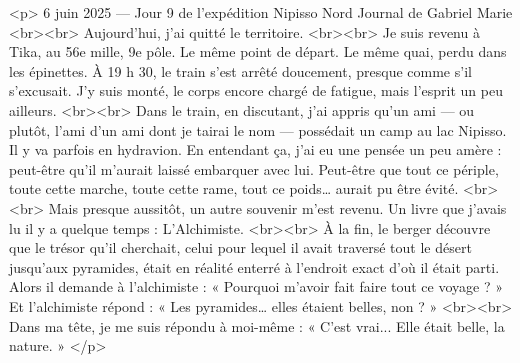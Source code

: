 <p>
6 juin 2025 — Jour 9 de l’expédition Nipisso Nord
Journal de Gabriel Marie
<br><br>
Aujourd’hui, j’ai quitté le territoire.
<br><br>
Je suis revenu à Tika, au 56e mille, 9e pôle. Le même point de départ. Le même quai, perdu dans les épinettes. À 19 h 30, le train s’est arrêté doucement, presque comme s’il s’excusait. J’y suis monté, le corps encore chargé de fatigue, mais l’esprit un peu ailleurs.
<br><br>
Dans le train, en discutant, j’ai appris qu’un ami — ou plutôt, l’ami d’un ami dont je tairai le nom — possédait un camp au lac Nipisso. Il y va parfois en hydravion. En entendant ça, j’ai eu une pensée un peu amère : peut-être qu’il m’aurait laissé embarquer avec lui. Peut-être que tout ce périple, toute cette marche, toute cette rame, tout ce poids… aurait pu être évité.
<br><br>
Mais presque aussitôt, un autre souvenir m’est revenu. Un livre que j’avais lu il y a quelque temps : L’Alchimiste.
<br><br>
À la fin, le berger découvre que le trésor qu’il cherchait, celui pour lequel il avait traversé tout le désert jusqu’aux pyramides, était en réalité enterré à l’endroit exact d’où il était parti. Alors il demande à l’alchimiste :
« Pourquoi m’avoir fait faire tout ce voyage ? »
Et l’alchimiste répond :
« Les pyramides… elles étaient belles, non ? »
<br><br>
Dans ma tête, je me suis répondu à moi-même :
« C’est vrai... Elle était belle, la nature. »
</p>